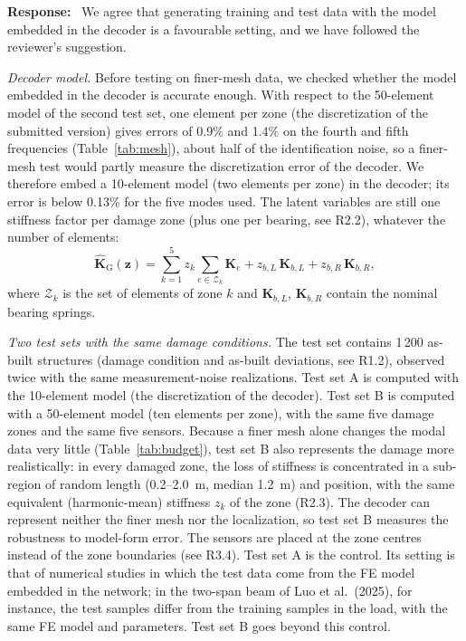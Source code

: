 \documentclass[11pt]{article}
\newenvironment{response}{\par\smallskip\noindent\color{resp}\textbf{Response:}\ }{\par}
\newcommand{\z}{\mathbf{z}}
\begin{document}
\begin{response}
We agree that generating training and test data with the model embedded in the decoder is a favourable setting, and
we have followed the reviewer's suggestion.

\textit{Decoder model.} Before testing on finer-mesh data, we checked whether the model embedded in the decoder is
accurate enough. With respect to the 50-element model of the second test set, one element per zone (the discretization
of the submitted version) gives errors of 0.9\% and 1.4\% on the fourth and fifth frequencies (Table~\ref{tab:mesh}),
about half of the identification noise, so a finer-mesh test would partly measure the discretization error of the
decoder. We therefore embed a 10-element model (two elements per zone) in the decoder; its error is below 0.13\% for the
five modes used. The latent variables are still one stiffness factor per damage zone (plus one per bearing, see R2.2),
whatever the number of elements:
\begin{equation}
\hat{\mathbf{K}}_{\mathrm{G}}(\z)=\sum_{k=1}^{5} z_k\sum_{e\in\mathcal{Z}_k}\mathbf{K}_{e}
+z_{b,L}\,\mathbf{K}_{b,L}+z_{b,R}\,\mathbf{K}_{b,R},
\label{eq:Kz}
\end{equation}
where $\mathcal{Z}_k$ is the set of elements of zone $k$ and $\mathbf{K}_{b,L}$, $\mathbf{K}_{b,R}$ contain the nominal
bearing springs.

\textit{Two test sets with the same damage conditions.} The test set contains 1\,200 as-built structures (damage
condition and as-built deviations, see R1.2), observed twice with the same measurement-noise realizations. Test set A is
computed with the 10-element model (the discretization of the decoder). Test set B is computed with a 50-element model
(ten elements per zone), with the same five damage zones and the same five sensors. Because a finer mesh alone changes
the modal data very little (Table~\ref{tab:budget}), test set B also represents the damage more realistically: in every
damaged zone, the loss of stiffness is concentrated in a sub-region of random length (0.2--2.0~m, median 1.2~m) and
position, with the same equivalent (harmonic-mean) stiffness $z_k$ of the zone (R2.3). The decoder can represent
neither the finer mesh nor the localization, so test set B measures the robustness to model-form error. The sensors are
placed at the zone centres instead of the zone boundaries (see R3.4). Test set A is the control. Its setting is that of
numerical studies in which the test data come from the FE model embedded in the network; in the two-span beam of Luo et al.\
(2025), for instance, the test samples differ from the training samples in the load, with the same FE model and parameters.
Test set B goes beyond this control.


\end{response}
\end{document}
